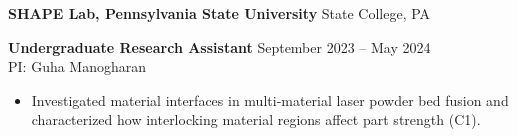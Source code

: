 \vspace{12pt}

\textbf{SHAPE Lab, Pennsylvania State University} \hfill State College, PA

\textbf{Undergraduate Research Assistant} \hfill September 2023 -- May 2024\\
PI: Guha Manogharan
\begin{itemize}[noitemsep, topsep=0pt, partopsep=0pt, parsep=0pt]
    \item Investigated material interfaces in multi-material laser powder bed fusion and characterized how interlocking material regions affect part strength (C1).
\end{itemize}
